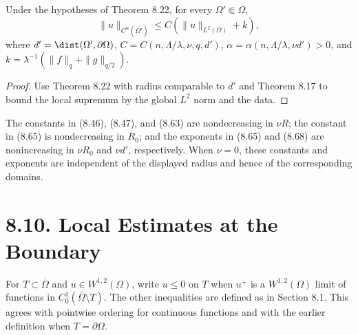 \begin{theorem}
\label{gt-thm-8-24-interior-holder-norm}
Under the hypotheses of Theorem 8.22, for every $\Omega'\Subset\Omega$,
\begin{equation}
\|u\|_{C^\alpha(\overline{\Omega'})}
\leq C(\|u\|_{L^2(\Omega)}+k),
\tag{8.68}
\end{equation}
where $d'=\dist(\Omega',\partial\Omega)$,
$C=C(n,\Lambda/\lambda,\nu,q,d')$,
$\alpha=\alpha(n,\Lambda/\lambda,\nu d')>0$, and
$k=\lambda^{-1}(\|f\|_q+\|g\|_{q/2})$.
\end{theorem}
\begin{proof}
\sketch Use Theorem 8.22 with radius comparable to $d'$ and Theorem 8.17 to
bound the local supremum by the global $L^2$ norm and the data.
\end{proof}

\begin{remark}
\label{gt-rem-8-local-constant-dependence}
The constants in (8.46), (8.47), and (8.63) are nondecreasing in $\nu R$;
the constant in (8.65) is nondecreasing in $R_0$; and the exponents in
(8.65) and (8.68) are nonincreasing in $\nu R_0$ and $\nu d'$, respectively.
When $\nu=0$, these constants and exponents are independent of the displayed
radius and hence of the corresponding domains.
\end{remark}

\section*{8.10. Local Estimates at the Boundary}

\begin{definition}
\label{gt-def-8-boundary-portion-inequality}
For $T\subset\overline\Omega$ and $u\in W^{1,2}(\Omega)$, write $u\leq0$ on
$T$ when $u^+$ is a $W^{1,2}(\Omega)$ limit of functions in
$C_0^1(\overline\Omega\setminus T)$. The other inequalities are defined as in
Section 8.1. This agrees with pointwise ordering for continuous functions and
with the earlier definition when $T=\partial\Omega$.
\end{definition}

